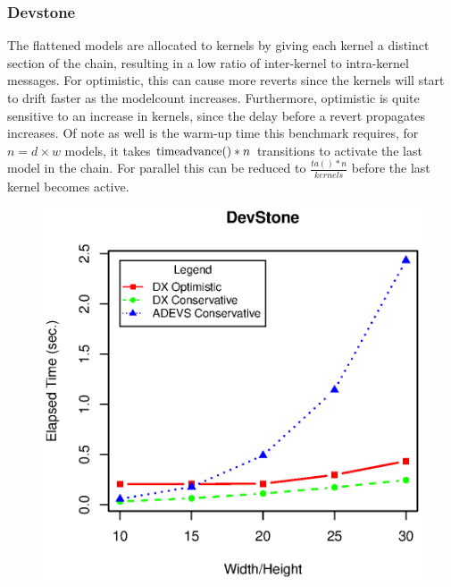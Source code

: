 \subsubsection{Devstone}
The flattened models are allocated to kernels by giving each kernel a distinct section of the chain, resulting in a low ratio of inter-kernel to intra-kernel messages. For optimistic, this can cause more reverts since the kernels will start to drift faster as the modelcount increases. Furthermore, optimistic is quite sensitive to an increase in kernels, since the delay before a revert propagates increases. Of note as well is the warm-up time this benchmark requires, for $n=d\times w$ models, it takes $\textup{timeadvance}()*n$ transitions to activate the last model in the chain. For parallel this can be reduced to $\frac{ta()*n}{kernels}$ before the last kernel becomes active.\\
\begin{figure}[h]
	\includegraphics[width=.5\textwidth]{fig/fig2.eps}
	\label{fig2.eps}
\end{figure}
